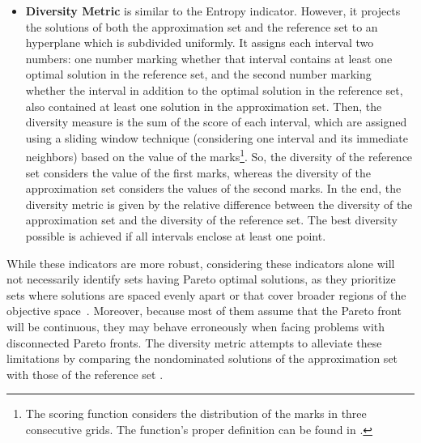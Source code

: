 \begin{itemize}
		\item \textbf{Diversity Metric} is similar to the Entropy indicator. However, it projects the solutions of both the approximation set and the reference set to an hyperplane which is subdivided uniformly. It assigns each interval two numbers: one number marking whether that interval contains at least one optimal solution in the reference set, and the second number marking whether the interval in addition to the optimal solution in the reference set, also contained at least one solution in the approximation set. Then, the diversity measure is the sum of the score of each interval, which are assigned using a sliding window technique (considering one interval and its immediate neighbors) based on the value of the marks\footnote{The scoring function considers the distribution of the marks in three consecutive grids. The function's proper definition can be found in \cite{Deb2002DM}.}. So, the diversity of the reference set considers the value of the first marks, whereas the diversity of the approximation set considers the values of the second marks. In the end, the diversity metric is given by the relative difference between the diversity of the approximation set and the diversity of the reference set. The best diversity possible is achieved if all intervals enclose at least one point\cite{Deb2002DM}.
		
	\end{itemize}
	
	While these indicators are more robust, considering these indicators alone will not necessarily identify sets having Pareto optimal solutions, as they prioritize sets where solutions are spaced evenly apart or that cover broader regions of the objective space~\cite{Veldhuizen1999GD}. Moreover, because most of them assume that the Pareto front will be continuous, they may behave erroneously when facing problems with disconnected Pareto fronts. The diversity metric attempts to alleviate these limitations by comparing the nondominated solutions of the approximation set with those of the reference set \cite{Deb2002DM}.
	
